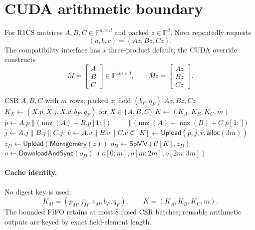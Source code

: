 \documentclass[9pt,twocolumn]{extarticle}
\newcommand{\F}{\mathbb{F}}
\newcommand{\SpMV}{\mathsf{SpMV}}
\newcommand{\nnz}{\operatorname{nnz}}
\begin{document}
\section{CUDA arithmetic boundary}

For R1CS matrices $A,B,C\in\F^{m\times d}$ and packed
$z\in\F^d$, Nova repeatedly requests
\begin{equation}
  (a,b,c)=(Az,Bz,Cz).                                        \label{eq:abc}
\end{equation}
The compatibility interface has a three-product default; the CUDA override
constructs
\begin{equation}
  \bar M=\begin{bmatrix}A\\B\\C\end{bmatrix}\in\F^{3m\times d},
  \qquad \bar Mz=\begin{bmatrix}Az\\Bz\\Cz\end{bmatrix}. \label{eq:vstack}
\end{equation}

\begin{algorithm}[t]
\caption{Exact-key fused $A/B/C$ sparse product}
\label{alg:fused}
\begin{algorithmic}[1]
\Require CSR $A,B,C$ with $m$ rows; packed $z$; field $(b_F,q_F)$
\Ensure $Az,Bz,Cz$
\State $K_X\gets(X.p,X.j,X.v,b_F,q_F)$ for $X\in\{A,B,C\}$
\State $K\gets(K_A,K_B,K_C,m)$
  \State $\bar p\gets A.p\|\bigl(\nnz(A)+B.p[1:]\bigr)$
  \State $\phantom{\bar p\gets{}}\|\bigl(\nnz(A)+\nnz(B)+C.p[1:]\bigr)$
  \State $\bar j\gets A.j\|B.j\|C.j$; $\bar v\gets A.v\|B.v\|C.v$
  \State $\mathcal C[K]\gets\mathsf{Upload}(\bar p,\bar j,\bar v,\mathsf{alloc}(3m))$
\EndIf
\State $z_D\gets\mathsf{Upload}(\mathsf{Montgomery}(z))$
\State $o_D\gets\SpMV(\mathcal C[K],z_D)$ 
\State $o\gets\mathsf{DownloadAndSync}(o_D)$ 
\State \Return $(o[0:m],o[m:2m],o[2m:3m])$
\end{algorithmic}
\end{algorithm}

\paragraph{Cache identity.}
No digest key is used:
\begin{equation}
 K_M=(p_M,j_M,v_M,b_F,q_F),\qquad K=(K_A,K_B,K_C,m).          \label{eq:key}
\end{equation}
The bounded FIFO retains at most 8 fused CSR batches; reusable arithmetic
outputs are keyed by exact field-element length.
\end{document}
